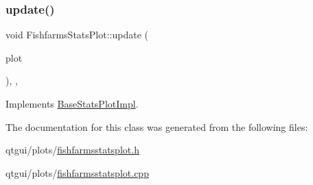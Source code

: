 \mbox{\label{class_fishfarms_stats_plot_ae089d568ff8a9936fb9b5c9d2e3f6ee1}} 
\subsubsection{\texorpdfstring{update()}{update()}\hspace{0.1cm}{\footnotesize\ttfamily [2/2]}}
{\footnotesize\ttfamily void Fishfarms\+Stats\+Plot\+::update (\begin{DoxyParamCaption}\item[{\mbox{\hyperlink{class_q_custom_plot}{Q\+Custom\+Plot}} $\ast$}]{plot }\end{DoxyParamCaption})\hspace{0.3cm}{\ttfamily [override]}, {\ttfamily [protected]}, {\ttfamily [virtual]}}



Implements \mbox{\hyperlink{class_base_stats_plot_impl_aa483fe8053767302195bb82bf9a3d7fb}{Base\+Stats\+Plot\+Impl}}.



The documentation for this class was generated from the following files\+:\begin{DoxyCompactItemize}
\item 
qtgui/plots/\mbox{\hyperlink{fishfarmsstatsplot_8h}{fishfarmsstatsplot.\+h}}\item 
qtgui/plots/\mbox{\hyperlink{fishfarmsstatsplot_8cpp}{fishfarmsstatsplot.\+cpp}}\end{DoxyCompactItemize}

